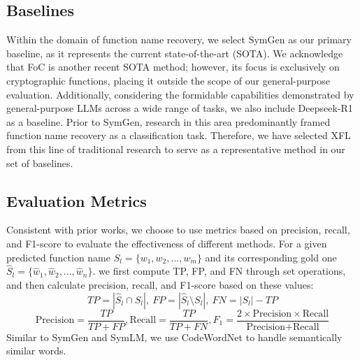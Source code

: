 \documentclass[acmsmall,screen,review,anonymous]{acmart} %
\begin{document}
\subsection{Baselines}
Within the domain of function name recovery, we select SymGen\cite{SymGen} as our primary baseline, as it represents the current state-of-the-art (SOTA). We acknowledge that FoC\cite{FoC} is another recent SOTA method; however, its focus is exclusively on cryptographic functions, placing it outside the scope of our general-purpose evaluation. Additionally, considering the formidable capabilities demonstrated by general-purpose LLMs across a wide range of tasks, we also include Deepseek-R1\cite{Deepseek-R1} as a baseline. Prior to SymGen\cite{SymGen}, research in this area predominantly framed function name recovery as a classification task. Therefore, we have selected XFL\cite{XFL} from this line of traditional research to serve as a representative method in our set of baselines.




\subsection{Evaluation Metrics}
Consistent with prior works\cite{NFRE, NERO, SimLLM, SymGen}, we choose to use metrics based on precision, recall, and F1-score to evaluate the effectiveness of different methods. For a given predicted function name $S_l = \{w_1, w_2, ..., w_m\}$ and its corresponding gold one $\hat{S}_l = \{\hat{w}_1, \hat{w}_2, ..., \hat{w}_n\}$. we first compute TP, FP, and FN through set operations, and then calculate precision, recall, and F1-score based on these values:
$$
TP = |\hat{S}_l \cap S_l|, \ FP = |\hat{S}_l \setminus S_l|, \ FN = |S_l| - TP
$$
$$
\text{Precision} = \frac{TP}{TP + FP}, \text{Recall} = \frac{TP}{TP + FN}, F_{1} = \frac{2 \times \text{Precision} \times \text{Recall}}{\text{Precision} + \text{Recall}}
$$
Similar to SymGen\cite{SymGen} and SymLM\cite{SymLM}, we use CodeWordNet to handle semantically similar words.
\end{document}
